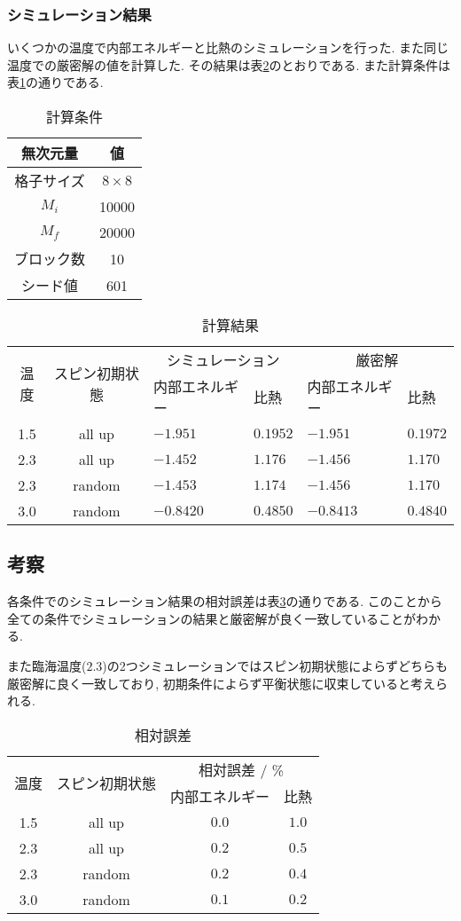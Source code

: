 \subsubsection{シミュレーション結果}
いくつかの温度で内部エネルギーと比熱のシミュレーションを行った.
また同じ温度での厳密解の値を計算した.
その結果は表\ref{tab:5a3}のとおりである.
また計算条件は表\ref{tab:5a2}の通りである.
\begin{table}[h]
\caption{計算条件}
\label{tab:5a2}
\centering
\begin{tabular}{cc}
\hline
無次元量&値\\
\hline \hline
格子サイズ&$8\times 8$\\
$M_i$&10000\\
$M_f$&20000\\
ブロック数&10\\
シード値&601\\
\hline
\end{tabular}
\end{table}
\begin{table}[h]
\caption{計算結果}
\label{tab:5a3}
\centering
\begin{tabular}{cc|ll|ll}
\hline
\multirow{2}{*}{温度}&\multirow{2}{*}{スピン初期状態}&\multicolumn{2}{c|}{シミュレーション}&\multicolumn{2}{c}{厳密解}\\
&&内部エネルギー&比熱&内部エネルギー&比熱\\
\hline \hline
1.5&all up&$-1.951$&$0.1952$&$-1.951$&$0.1972$\\
2.3&all up&$-1.452$&$1.176$&$-1.456$&$1.170$\\
2.3&random&$-1.453$&$1.174$&$-1.456$&$1.170$\\
3.0&random&$-0.8420$&$0.4850$&$-0.8413$&$0.4840$\\
\hline
\end{tabular}
\end{table}
\subsection{考察}
各条件でのシミュレーション結果の相対誤差は表\ref{tab:5a4}の通りである.
このことから全ての条件でシミュレーションの結果と厳密解が良く一致していることがわかる.

また臨海温度($2.3$)の2つシミュレーションではスピン初期状態によらずどちらも厳密解に良く一致しており,
初期条件によらず平衡状態に収束していると考えられる.
\begin{table}[h]
\caption{相対誤差}
\label{tab:5a4}
\centering
\begin{tabular}{cc|cc}
\hline
\multirow{2}{*}{温度}&\multirow{2}{*}{スピン初期状態}&\multicolumn{2}{c}{相対誤差 / \%}\\
&&内部エネルギー&比熱\\
\hline \hline
1.5&all up&$0.0$&$1.0$\\
2.3&all up&$0.2$&$0.5$\\
2.3&random&$0.2$&$0.4$\\
3.0&random&$0.1$&$0.2$\\
\hline
\end{tabular}
\end{table}
